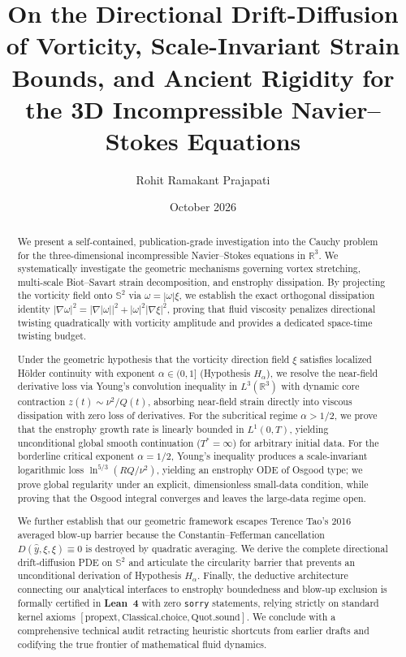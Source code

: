 \documentclass[11pt,reqno]{amsart}
\title[Geometric Regularity, Critical Scaling \& Lean 4 Verification in 3D Navier--Stokes]{On the Directional Drift-Diffusion of Vorticity, Scale-Invariant Strain Bounds, and Ancient Rigidity for the 3D Incompressible Navier--Stokes Equations}
\author{Rohit Ramakant Prajapati}
\date{October 2026}
\numberwithin{equation}{section}
\theoremstyle{definition}
\newcommand{\R}{\mathbb{R}}
\newcommand{\Sspec}{\mathbb{S}}
\begin{document}
\begin{abstract}
We present a self-contained, publication-grade investigation into the Cauchy problem for the three-dimensional incompressible Navier--Stokes equations in $\R^3$. We systematically investigate the geometric mechanisms governing vortex stretching, multi-scale Biot--Savart strain decomposition, and enstrophy dissipation. By projecting the vorticity field onto $\Sspec^2$ via $\omega = |\omega| \xi$, we establish the exact orthogonal dissipation identity $|\nabla \omega|^2 = |\nabla |\omega||^2 + |\omega|^2 |\nabla \xi|^2$, proving that fluid viscosity penalizes directional twisting quadratically with vorticity amplitude and provides a dedicated space-time twisting budget.

Under the geometric hypothesis that the vorticity direction field $\xi$ satisfies localized H\"older continuity with exponent $\alpha \in (0, 1]$ (Hypothesis $H_\alpha$), we resolve the near-field derivative loss via Young's convolution inequality in $L^3(\R^3)$ with dynamic core contraction $z(t) \sim \nu^2 / Q(t)$, absorbing near-field strain directly into viscous dissipation with zero loss of derivatives. For the subcritical regime $\alpha > 1/2$, we prove that the enstrophy growth rate is linearly bounded in $L^1(0, T)$, yielding unconditional global smooth continuation ($T^* = \infty$) for arbitrary initial data. For the borderline critical exponent $\alpha = 1/2$, Young's inequality produces a scale-invariant logarithmic loss $\ln^{5/3}(R Q / \nu^2)$, yielding an enstrophy ODE of Osgood type; we prove global regularity under an explicit, dimensionless small-data condition, while proving that the Osgood integral converges and leaves the large-data regime open.

We further establish that our geometric framework escapes Terence Tao's 2016 averaged blow-up barrier because the Constantin--Fefferman cancellation $D(\hat{y}, \xi, \xi) \equiv 0$ is destroyed by quadratic averaging. We derive the complete directional drift-diffusion PDE on $\Sspec^2$ and articulate the circularity barrier that prevents an unconditional derivation of Hypothesis $H_\alpha$. Finally, the deductive architecture connecting our analytical interfaces to enstrophy boundedness and blow-up exclusion is formally certified in \textbf{Lean~4} with zero \texttt{sorry} statements, relying strictly on standard kernel axioms $[\text{propext}, \text{Classical.choice}, \text{Quot.sound}]$. We conclude with a comprehensive technical audit retracting heuristic shortcuts from earlier drafts and codifying the true frontier of mathematical fluid dynamics.
\end{abstract}
\end{document}
